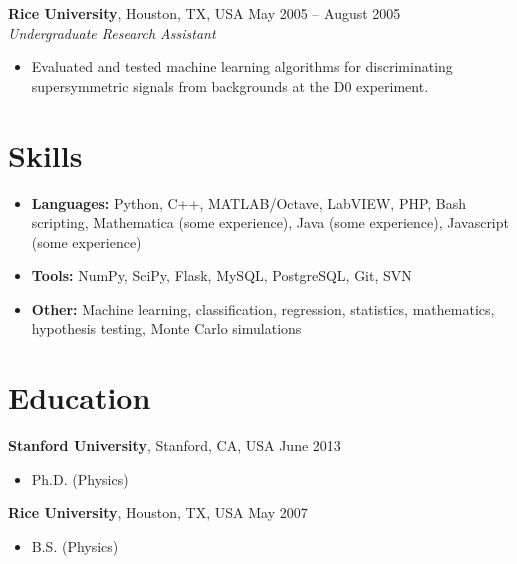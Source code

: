 \documentclass[margin,line]{resume}
\begin{document}
\begin{resume}
    \textbf{Rice University}, Houston, TX, USA \hfill May 2005 -- August 2005 \vspace{1mm}\\\vspace{1mm}%
    \textsl{Undergraduate Research Assistant}
    \begin{itemize}
    \item Evaluated and tested machine learning algorithms for discriminating supersymmetric signals from backgrounds at the D0 experiment.
    \end{itemize}
    
    \section{\mysidestyle Skills}\vspace{0mm}%
    \begin{itemize}
    \item \textbf{Languages:} Python, C++, MATLAB/Octave, LabVIEW, PHP, Bash scripting, Mathematica (some experience), Java (some experience), Javascript (some experience)
    \item \textbf{Tools:} NumPy, SciPy, Flask, MySQL, PostgreSQL, Git, SVN
    \item \textbf{Other:} Machine learning, classification, regression, statistics, mathematics, hypothesis testing, Monte Carlo simulations
    \end{itemize}
    
    \section{\mysidestyle Education}

    \textbf{Stanford University}, Stanford, CA, USA \hfill June 2013\vspace{-3mm}\\\vspace{-1mm}%
    \begin{itemize}
    \item Ph.D. (Physics)
    \end{itemize}\vspace{-1.5mm}
    
    \textbf{Rice University}, Houston, TX, USA \hfill May 2007\vspace{-3mm}\\\vspace{-1mm}%
    \begin{itemize}
    \item B.S. (Physics)
    \end{itemize}\vspace{-1.5mm}
 

\end{resume}
\end{document}

